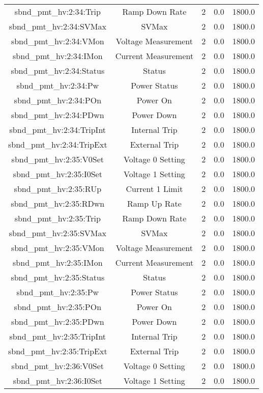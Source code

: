 \begin{center}
\begin{longtable}{c | c c c c }
sbnd\_pmt\_hv:2:34:Trip & Ramp Down Rate & 2 & 0.0 & 1800.0\\ 
sbnd\_pmt\_hv:2:34:SVMax & SVMax & 2 & 0.0 & 1800.0\\ 
sbnd\_pmt\_hv:2:34:VMon & Voltage Measurement & 2 & 0.0 & 1800.0\\ 
sbnd\_pmt\_hv:2:34:IMon & Current Measurement & 2 & 0.0 & 1800.0\\ 
sbnd\_pmt\_hv:2:34:Status & Status & 2 & 0.0 & 1800.0\\ 
sbnd\_pmt\_hv:2:34:Pw & Power Status & 2 & 0.0 & 1800.0\\ 
sbnd\_pmt\_hv:2:34:POn & Power On & 2 & 0.0 & 1800.0\\ 
sbnd\_pmt\_hv:2:34:PDwn & Power Down & 2 & 0.0 & 1800.0\\ 
sbnd\_pmt\_hv:2:34:TripInt & Internal Trip & 2 & 0.0 & 1800.0\\ 
sbnd\_pmt\_hv:2:34:TripExt & External Trip & 2 & 0.0 & 1800.0\\ 
sbnd\_pmt\_hv:2:35:V0Set & Voltage 0 Setting & 2 & 0.0 & 1800.0\\ 
sbnd\_pmt\_hv:2:35:I0Set & Voltage 1 Setting & 2 & 0.0 & 1800.0\\ 
sbnd\_pmt\_hv:2:35:RUp & Current 1 Limit & 2 & 0.0 & 1800.0\\ 
sbnd\_pmt\_hv:2:35:RDwn & Ramp Up Rate & 2 & 0.0 & 1800.0\\ 
sbnd\_pmt\_hv:2:35:Trip & Ramp Down Rate & 2 & 0.0 & 1800.0\\ 
sbnd\_pmt\_hv:2:35:SVMax & SVMax & 2 & 0.0 & 1800.0\\ 
sbnd\_pmt\_hv:2:35:VMon & Voltage Measurement & 2 & 0.0 & 1800.0\\ 
sbnd\_pmt\_hv:2:35:IMon & Current Measurement & 2 & 0.0 & 1800.0\\ 
sbnd\_pmt\_hv:2:35:Status & Status & 2 & 0.0 & 1800.0\\ 
sbnd\_pmt\_hv:2:35:Pw & Power Status & 2 & 0.0 & 1800.0\\ 
sbnd\_pmt\_hv:2:35:POn & Power On & 2 & 0.0 & 1800.0\\ 
sbnd\_pmt\_hv:2:35:PDwn & Power Down & 2 & 0.0 & 1800.0\\ 
sbnd\_pmt\_hv:2:35:TripInt & Internal Trip & 2 & 0.0 & 1800.0\\ 
sbnd\_pmt\_hv:2:35:TripExt & External Trip & 2 & 0.0 & 1800.0\\ 
sbnd\_pmt\_hv:2:36:V0Set & Voltage 0 Setting & 2 & 0.0 & 1800.0\\ 
sbnd\_pmt\_hv:2:36:I0Set & Voltage 1 Setting & 2 & 0.0 & 1800.0\\ 

\end{longtable}
\end{center}

